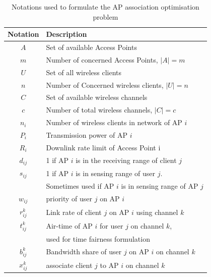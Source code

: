 \documentclass[journal,transmag]{IEEEtran}
\begin{document}
\begin{center} 
\begin{table}[htbp]
\centering
\begin{tabular}{|c|l|} %
\hline
Notation 		& Description \\
\hline
$A$				& Set of available Access Points\\
$m$				& Number of concerned Access Points, $|A|=m$ \\
$U$				& Set of all wireless clients \\
$n$				& Number of Concerned wireless clients, $|U|=n$  \\
$C$ 				& Set of available wireless channels\\
$c$		        & Number of total wireless channels, $|C|=c$  \\
$n_i$			& Number of wireless clients in network of AP $i$\\
$P_i$			& Transmission power of AP $i$ \\
$R_i$			& Downlink rate limit of Access Point i\\
$d_{ij}$			& 1 if AP $i$ is in the receiving range of client $j$ \\
$s_{ij}$			& 1 if AP $i$ is in sensing range of user $j$. \\
				& Sometimes used if AP $i$ is in sensing range  of AP $j$\\
$w_{ij}$			& priority of user $j$ on AP $i$ \\			
$r_{ij}^k$ 		& Link rate of client $j$ on AP $i$ using channel $k$\\
$t_{ij}^k$		& Air-time of AP $i$ for user $j$ on channel $k$, \\
				& used for time fairness formulation \\
$b_{ij}^k$		& Bandwidth share of user $j$ on AP $i$ on channel $k$ \\			
$x_{ij}^k$		& associate client $j$ to AP $i$ on channel $k$\\


\hline
\end{tabular}
\caption{\label{AP association_formulate_table} Notations used to formulate the AP association optimisation problem}
\end{table}
\end{center}
\end{document}

